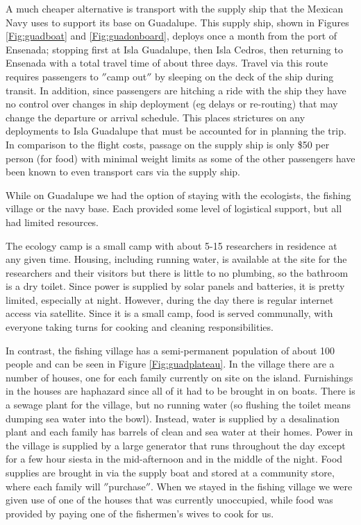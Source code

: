 A much cheaper alternative is transport with the supply ship that the Mexican Navy uses to support its base on Guadalupe. This supply ship, shown in Figures \ref{Fig:guadboat} and \ref{Fig:guadonboard}, deploys once a month from the port of Ensenada; stopping first at Isla Guadalupe, then Isla Cedros, then returning to Ensenada with a total travel time of about three days. Travel via this route requires passengers to $''$camp out$''$ by sleeping on the deck of the ship during transit. In addition, since passengers are hitching a ride with the ship they have no control over changes in ship deployment (eg delays or re-routing) that may change the departure or arrival schedule. This places strictures on any deployments to Isla Guadalupe that must be accounted for in planning the trip. In comparison to the flight costs, passage on the supply ship is only \$50 per person (for food) with minimal weight limits as some of the other passengers have been known to even transport cars via the supply ship. 

While on Guadalupe we had the option of staying with the ecologists, the fishing village or the navy base. Each provided some level of logistical support, but all had limited resources. 

The ecology camp is a small camp with about 5-15 researchers in residence at any given time. Housing, including running water, is available at the site for the researchers and their visitors but there is little to no plumbing, so the bathroom is a dry toilet.  Since power is supplied by solar panels and batteries, it is pretty limited, especially at night. However, during the day there is regular internet access via satellite. Since it is a small camp, food is served communally, with everyone taking turns for cooking and cleaning responsibilities. 

In contrast, the fishing village has a semi-permanent population of about 100 people and can be seen in Figure \ref{Fig:guadplateau}. In the village there are a number of houses, one for each family currently on site on the island. Furnishings in the houses are haphazard since all of it had to be brought in on boats. There is a sewage plant for the village, but no running water (so flushing the toilet means dumping sea water into the bowl). Instead, water is supplied by a desalination plant and each family has barrels of clean and sea water at their homes. Power in the village is supplied by a large generator that runs throughout the day except for a few hour siesta in the mid-afternoon and in the middle of the night. Food supplies are brought in via the supply boat and stored at a community store, where each family will $''$purchase$''$. When we stayed in the fishing village we were given use of one of the houses that was currently unoccupied, while food was provided by paying one of the fishermen's wives to cook for us. 

